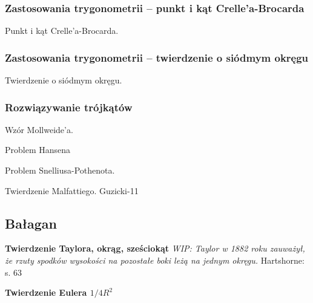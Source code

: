 \subsubsection{Zastosowania trygonometrii -- punkt i kąt Crelle'a-Brocarda}
Punkt i kąt Crelle'a-Brocarda.

\subsubsection{Zastosowania trygonometrii -- twierdzenie o siódmym okręgu}
Twierdzenie o siódmym okręgu.

\subsubsection{Rozwiązywanie trójkątów}
Wzór Mollweide'a.
%

Problem Hansena
%

Problem Snelliusa-Pothenota.
%



Twierdzenie Malfattiego.
Guzicki-11

\subsection{Bałagan}

\textbf{Twierdzenie Taylora, okrąg, sześciokąt}
{
    \emph{WIP: Taylor w 1882 roku zauważył, że rzuty spodków wysokości na pozostałe boki leżą na jednym okręgu.}
	Hartshorne: s. 63
}

\textbf{Twierdzenie Eulera $1/4R^2$}



%